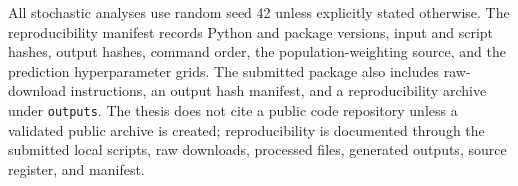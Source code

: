All stochastic analyses use random seed 42 unless explicitly stated otherwise. The reproducibility manifest records Python and package versions, input and script hashes, output hashes, command order, the population-weighting source, and the prediction hyperparameter grids. The submitted package also includes raw-download instructions, an output hash manifest, and a reproducibility archive under \texttt{outputs}. The thesis does not cite a public code repository unless a validated public archive is created; reproducibility is documented through the submitted local scripts, raw downloads, processed files, generated outputs, source register, and manifest.
